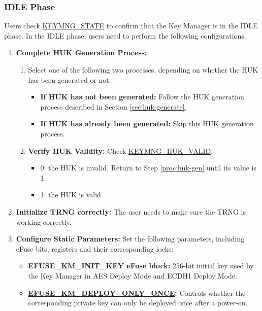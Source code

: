 \documentclass[main\_\_EN.tex]{subfiles}
\begin{document}
\subsubsection{IDLE Phase}

Users check \hyperref[fielddesc:KEYMNGSTATE]{KEYMNG\_STATE} to confirm that the Key Manager is in the IDLE phase. In the IDLE phase, users need to perform the following configurations.
\begin{enumerate}
    \item \textbf{Complete HUK Generation Process:}
    \begin{enumerate}
        \item Select one of the following two processes, depending on whether the HUK has been generated or not:
        \label{proc:huk-gen}
        \begin{itemize}
            \item \textbf{If HUK has not been generated:} Follow the HUK generation process described in Section \ref{sec:huk-generate}.
            \item \textbf{If HUK has already been generated:} Skip this HUK generation process.
        \end{itemize}
        \item \textbf{Verify HUK Validity:} Check  \hyperref[fielddesc:KEYMNGHUKVALID]{KEYMNG\_HUK\_VALID}:
        \begin{itemize}
            \item 0: the HUK is invalid. Return to Step \ref{proc:huk-gen} until its value is 1.
            \item 1: the HUK is valid.
        \end{itemize}
    \end{enumerate}
    \item \textbf{Initialize TRNG correctly:} The user needs to make sure the TRNG is working correctly.
    \item \textbf{Configure Static Parameters:} Set the following parameters, including eFuse bits, registers and their corresponding locks:
    \begin{itemize}
        \item \textbf{EFUSE\_KM\_INIT\_KEY eFuse block:} 256-bit initial key used by the Key Manager in AES Deploy Mode and ECDH1 Deploy Mode.
        \item \textbf{\hyperref[fielddesc:EFUSEKMDEPLOYONLYONCE]{EFUSE\_KM\_DEPLOY\_ONLY\_ONCE}:} Controls whether the corresponding private key can only be deployed once after a power-on. 
        \begin{itemize}

\end{itemize}
\end{itemize}
\end{enumerate}
\end{document}
